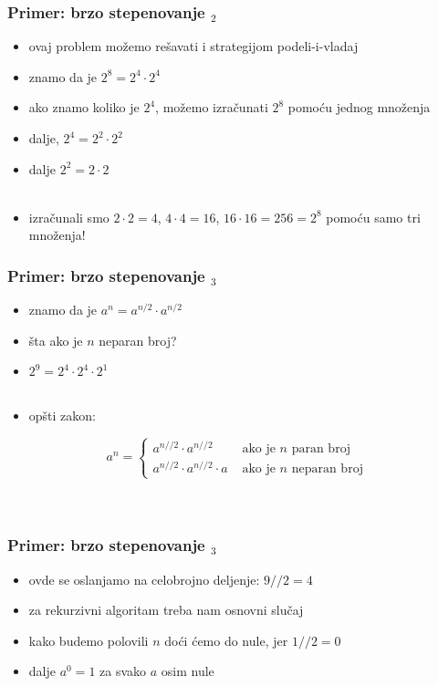 \documentclass[utf8,compress,aspectratio=169]{beamer}
\begin{document}
\begin{frame}[fragile]
  \frametitle{Primer: brzo stepenovanje $_2$}
  \begin{itemize}
    \item ovaj problem možemo rešavati i strategijom podeli-i-vladaj
    \item znamo da je $2^8 = 2^4\cdot 2^4$
    \item ako znamo koliko je $2^4$, možemo izračunati $2^8$ pomoću jednog množenja
    \item dalje, $2^4 = 2^2\cdot 2^2$
    \item dalje $2^2 = 2\cdot 2$ \\ \ \\
    \item izračunali smo $2\cdot 2 = 4$, $4\cdot 4 = 16$, $16\cdot 16 = 256 = 2^8$ pomoću samo tri množenja!
  \end{itemize}
\end{frame}

\begin{frame}[fragile]
  \frametitle{Primer: brzo stepenovanje $_3$}
  \begin{itemize}
    \item znamo da je $a^n = a^{n/2}\cdot a^{n/2}$
    \item šta ako je $n$ neparan broj?
    \item $2^9 = 2^4\cdot 2^4\cdot 2^1$ \\ \ \\
    \item opšti zakon:
  \end{itemize}
    $$ a^n = \left\{
      \begin{array}{ll}
        a^{n//2}\cdot a^{n//2} &\mbox{ ako je $n$ paran broj} \\
        a^{n//2}\cdot a^{n//2}\cdot a &\mbox{ ako je $n$ neparan broj}
      \end{array}
      \right. $$ \\ \ \\
\end{frame}

\begin{frame}[fragile]
  \frametitle{Primer: brzo stepenovanje $_3$}
  \begin{itemize}
    \item ovde se oslanjamo na celobrojno deljenje: $9//2 = 4$
    \item za rekurzivni algoritam treba nam osnovni slučaj
    \item kako budemo polovili $n$ doći ćemo do nule, jer $1//2=0$
    \item dalje $a^0 = 1$ za svako $a$ osim nule
  \end{itemize}
\end{frame}
\end{document}
